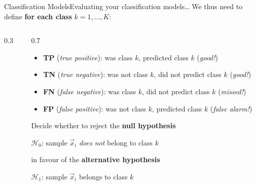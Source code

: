 \begin{frame}{Classification Models}{Evaluating your classification models\dots}
    We thus need to define \textbf{for each class} $k = 1, \dots, K$:

    \vfill

    \begin{columns}[c]
        \begin{column}{0.3\textwidth}
            \centering
            
        \end{column}
        \hfil
        \begin{column}{0.7\textwidth}
            \begin{itemize}
                \item \textbf{TP} {\footnotesize (\emph{true positive})}: was class $k$, predicted class $k$ (\emph{good!})
                \item \textbf{TN} {\footnotesize (\emph{true negative})}: was not class $k$, did not predict class $k$ (\emph{good!})
                \item \textbf{FN} {\footnotesize (\emph{false negative})}: was class $k$, did not predict class $k$ (\emph{missed!})
                \item \textbf{FP} {\footnotesize (\emph{false positive})}: was not class $k$,  predicted class $k$ (\emph{false alarm!})
            \end{itemize}

            \pause

            Decide whether to reject the \textbf{null hypothesis}
            \begin{center}
                $\mathcal{H}_0$: sample $\vec{x}_i$ \emph{does not} belong to class $k$
            \end{center}
            in favour of the \textbf{alternative hypothesis}
            \begin{center}
                $\mathcal{H}_1$: sample $\vec{x}_i$ belongs to class $k$
            \end{center}
        \end{column}
    \end{columns}
\end{frame}

